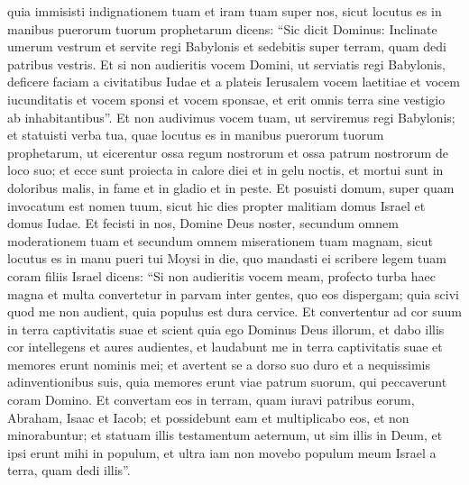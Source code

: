 \begin{biblechapter}
\verse quia immisisti indignationem tuam et iram tuam super nos, sicut locutus es in manibus puerorum tuorum prophetarum dicens: 
\verse “Sic dicit Dominus: Inclinate umerum vestrum et servite regi Babylonis et sedebitis super terram, quam dedi patribus vestris. 
\verse Et si non audieritis vocem Domini, ut serviatis regi Babylonis, deficere faciam a civitatibus Iudae et a plateis Ierusalem 
\verse vocem laetitiae et vocem iucunditatis et vocem sponsi et vocem sponsae, et erit omnis terra sine vestigio ab inhabitantibus”. 
\verse Et non audivimus vocem tuam, ut serviremus regi Babylonis; et statuisti verba tua, quae locutus es in manibus puerorum tuorum prophetarum, ut eicerentur ossa regum nostrorum et ossa patrum nostrorum de loco suo; 
\verse et ecce sunt proiecta in calore diei et in gelu noctis, et mortui sunt in doloribus malis, in fame et in gladio et in peste.  
\verse Et posuisti domum, super quam invocatum est nomen tuum, sicut hic dies propter malitiam domus Israel et domus Iudae. 
\verse Et fecisti in nos, Domine Deus noster, secundum omnem moderationem tuam et secundum omnem miserationem tuam magnam, 
\verse sicut locutus es in manu pueri tui Moysi in die, quo mandasti ei scribere legem tuam coram filiis Israel 
\verse dicens: “Si non audieritis vocem meam, profecto turba haec magna et multa convertetur in parvam inter gentes, quo eos dispergam; 
\verse quia scivi quod me non audient, quia populus est dura cervice. Et convertentur ad cor suum in terra captivitatis suae  
\verse et scient quia ego Dominus Deus illorum, et dabo illis cor intellegens et aures audientes, 
\verse et laudabunt me in terra captivitatis suae et memores erunt nominis mei; 
\verse et avertent se a dorso suo duro et a nequissimis adinventionibus suis, quia memores erunt viae patrum suorum, qui peccaverunt coram Domino. 
\verse Et convertam eos in terram, quam iuravi patribus eorum, Abraham, Isaac et Iacob; et possidebunt eam et multiplicabo eos, et non minorabuntur; 
\verse et statuam illis testamentum aeternum, ut sim illis in Deum, et ipsi erunt mihi in populum, et ultra iam non movebo populum meum Israel a terra, quam dedi illis”. 
\end{biblechapter}

